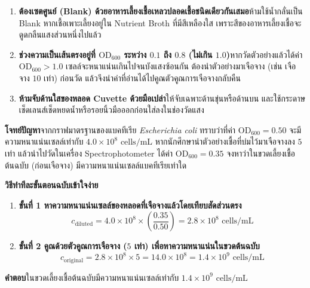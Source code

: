 \vspace{4pt}


\begin{warningbox}
\begin{enumerate}
    \item \textbf{ต้องเซตศูนย์ (Blank) ด้วยอาหารเลี้ยงเชื้อเหลวปลอดเชื้อชนิดเดียวกันเสมอ}\quad ห้ามใช้น้ำกลั่นเป็น Blank หากเชื้อเพาะเลี้ยงอยู่ใน Nutrient Broth ที่มีสีเหลืองใส เพราะสีของอาหารเลี้ยงเชื้อจะดูดกลืนแสงส่วนหนึ่งไปแล้ว
    \item \textbf{ช่วงความเป็นเส้นตรงอยู่ที่ $\text{OD}_{600}$ ระหว่าง $0.1$ ถึง $0.8$ (ไม่เกิน $1.0$)}\quad หากวัดตัวอย่างแล้วได้ค่า $\text{OD}_{600} > 1.0$ เซลล์จะหนาแน่นเกินไปจนบังแสงซ้อนกัน ต้องนำตัวอย่างมาเจือจาง (เช่น เจือจาง $10$ เท่า) ก่อนวัด แล้วจึงนำค่าที่อ่านได้ไปคูณตัวคูณการเจือจางกลับคืน
    \item \textbf{ห้ามจับด้านใสของหลอด Cuvette ด้วยมือเปล่า}\quad ให้จับเฉพาะด้านขุ่นหรือด้านบน และใช้กระดาษเช็ดเลนส์เช็ดหยดน้ำหรือรอยนิ้วมือออกก่อนใส่ลงในช่องวัดแสง
\end{enumerate}
\end{warningbox}

\begin{worked}
\textbf{โจทย์ปัญหา}\quad จากกราฟมาตรฐานของแบคทีเรีย \textit{Escherichia coli} ทราบว่าที่ค่า $\text{OD}_{600} = 0.50$ จะมีความหนาแน่นเซลล์เท่ากับ $4.0 \times 10^8\text{ cells/mL}$ หากนักศึกษานำตัวอย่างเชื้อที่บ่มไว้มาเจือจางลง $5$ เท่า แล้วนำไปวัดในเครื่อง Spectrophotometer ได้ค่า $\text{OD}_{600} = 0.35$ จงหาว่าในขวดเลี้ยงเชื้อต้นฉบับ (ก่อนเจือจาง) มีความหนาแน่นเซลล์แบคทีเรียเท่าใด

\textbf{วิธีทำทีละขั้นตอนฉบับเข้าใจง่าย}
\begin{enumerate}
    \item \textbf{ขั้นที่ 1 หาความหนาแน่นเซลล์ของหลอดที่เจือจางแล้วโดยเทียบสัดส่วนตรง}
    \[
        c_{\text{diluted}} = 4.0 \times 10^8 \times \left(\frac{0.35}{0.50}\right) = 2.8 \times 10^8\text{ cells/mL}
    \]
    \item \textbf{ขั้นที่ 2 คูณด้วยตัวคูณการเจือจาง ($5$ เท่า) เพื่อหาความหนาแน่นในขวดต้นฉบับ}
    \[
        c_{\text{original}} = 2.8 \times 10^8 \times 5 = 14.0 \times 10^8 = 1.4 \times 10^9\text{ cells/mL}
    \]
\end{enumerate}
\textbf{คำตอบ}\quad ในขวดเลี้ยงเชื้อต้นฉบับมีความหนาแน่นเซลล์เท่ากับ $1.4 \times 10^9\text{ cells/mL}$
\end{worked}

